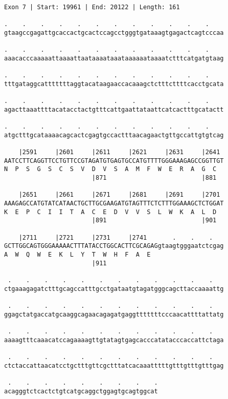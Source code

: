 \documentclass{article}
\begin{document}
\begin{Verbatim}
Exon 7 | Start: 19961 | End: 20122 | Length: 161
 
.    .    .    .    .    .    .    .    .    .    .    .    
gtaagccgagattgcaccactgcactccagcctgggtgataaagtgagactcagtcccaa
  
.    .    .    .    .    .    .    .    .    .    .    .    
aaacacccaaaaattaaaattaataaaataaataaaaaataaaatctttcatgatgtaag
  
.    .    .    .    .    .    .    .    .    .    .    .    
tttgataggcatttttttaggtacataagaaccacaaagctctttcttttcacctgcata
  
.    .    .    .    .    .    .    .    .    .    .    .    
agacttaaattttacatacctactgtttcattgaattataattcatcactttgcatactt
  
.    .    .    .    .    .    .    .    .    .    .    .    
atgctttgcataaaacagcactcgagtgccactttaacagaactgttgccattgtgtcag
  
    |2591     |2601     |2611     |2621     |2631     |2641 
AATCCTTCAGGTTCCTGTTCCGTAGATGTGAGTGCCATGTTTTGGGAAAGAGCCGGTTGT
N  P  S  G  S  C  S  V  D  V  S  A  M  F  W  E  R  A  G  C  
                        |871                          |881  
  
    |2651     |2661     |2671     |2681     |2691     |2701 
AAAGAGCCATGTATCATAACTGCTTGCGAAGATGTAGTTTCTCTTTGGAAAGCTCTGGAT
K  E  P  C  I  I  T  A  C  E  D  V  V  S  L  W  K  A  L  D  
                        |891                          |901  
  
    |2711     |2721     |2731     |2741       .    .    .   
GCTTGGCAGTGGGAAAAACTTTATACCTGGCACTTCGCAGAGgtaagtgggaatctcgag
A  W  Q  W  E  K  L  Y  T  W  H  F  A  E                    
                        |911                                
  
 .    .    .    .    .    .    .    .    .    .    .    .   
ctgaaagagatctttgcagccatttgcctgataatgtagatgggcagcttaccaaaattg
  
 .    .    .    .    .    .    .    .    .    .    .    .   
ggagctatgaccatgcaaggcagaacagagatgaggtttttttcccaacattttattatg
  
 .    .    .    .    .    .    .    .    .    .    .    .   
aaaagtttcaaacatccagaaaagttgtatagtgagcacccatatacccaccattctaga
  
 .    .    .    .    .    .    .    .    .    .    .    .   
ctctaccattaacatcctgctttgttcgctttatcacaaatttttgtttgtttgtttgag
  
 .    .    .    .    .    .    .    .    .
acagggtctcactctgtcatgcaggctggagtgcagtggcat
\end{Verbatim}
\end{document}
